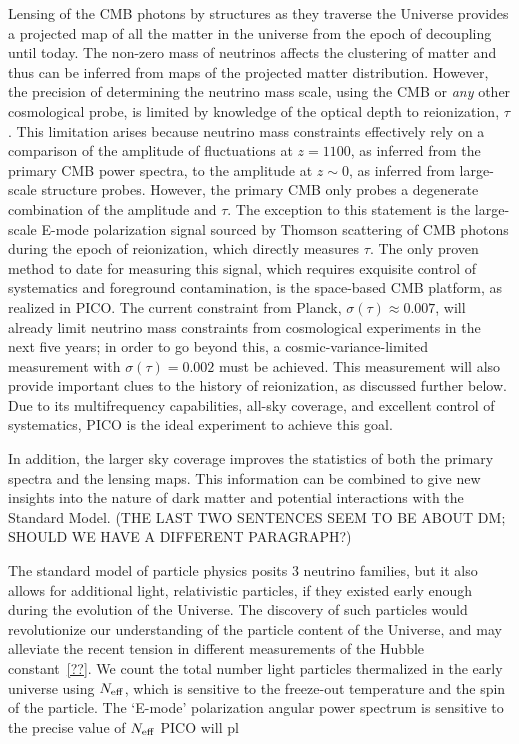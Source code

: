 \documentclass[PICOReport.tex]{subfiles}
\begin{document}
Lensing of the CMB photons by structures as they traverse the Universe provides a projected map of all the matter 
in the universe from the epoch of decoupling until today.  The non-zero mass of neutrinos affects the clustering of matter and thus can be inferred from maps of the projected matter distribution. However, the precision of determining the neutrino mass scale, using the CMB or {\it any} other cosmological probe, is limited by knowledge of the optical depth to reionization, $\tau$.  This limitation arises because neutrino mass constraints effectively rely on a comparison of the amplitude of fluctuations at $z=1100$, as inferred from the primary CMB power spectra, to the amplitude at $z \sim 0$, as inferred from large-scale structure probes.  However, the primary CMB only probes a degenerate combination of the amplitude and $\tau$.  The exception to this statement is the large-scale E-mode polarization signal sourced by Thomson scattering of CMB photons during the epoch of reionization, which directly measures $\tau$.  The only proven method to date for measuring this signal, which requires exquisite control of systematics and foreground contamination, is the space-based CMB platform, as realized in PICO.  The current constraint from Planck, $\sigma(\tau) \approx 0.007$, will already limit neutrino mass constraints from cosmological experiments in the next five years; in order to go beyond this, a cosmic-variance-limited measurement with $\sigma(\tau) = 0.002$ must be achieved.  This measurement will also provide important clues to the history of reionization, as discussed further below.  Due to its multifrequency capabilities, all-sky coverage, and excellent control of systematics, PICO is the ideal experiment to achieve this goal.

In addition, the larger sky coverage improves the statistics of both the primary spectra and the lensing maps.  
This information can be combined to give new insights into the nature of dark matter and potential interactions 
with the Standard Model. (THE LAST TWO SENTENCES SEEM TO BE ABOUT DM; SHOULD WE HAVE A DIFFERENT 
PARAGRAPH?)

The standard model of particle physics posits 3 neutrino families, but it also allows for additional light, relativistic particles, if 
they existed early enough during the evolution of the Universe. The discovery of such particles would revolutionize our understanding
of the particle content of the Universe, 
and may alleviate the recent tension in different measurements of the Hubble constant~\ref{??}.  We count the total number 
light particles thermalized in the early universe using ${N_{\rm eff}}$, which is sensitive to the freeze-out temperature and 
the spin of the particle. The `E-mode' polarization angular power spectrum is sensitive to the precise value of ${N_{\rm eff}}$ PICO 
will pl
\end{document}
